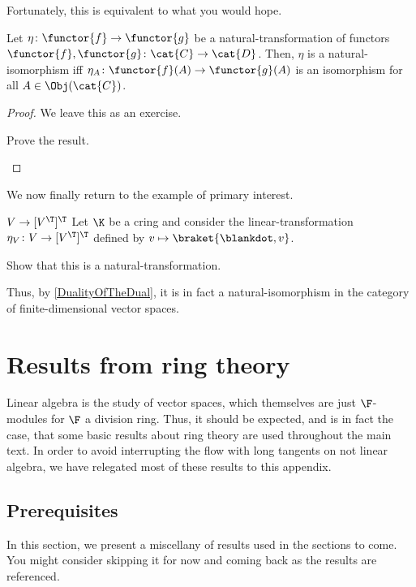 Fortunately, this is equivalent to what you would hope.
\begin{prp}{}{}
	Let $\eta \colon \functor{f}\rightarrow \functor{g}$ be a natural-transformation of functors $\functor{f},\functor{g}\colon \cat{C}\rightarrow \cat{D}$.  Then, $\eta$ is a natural-isomorphism iff $\eta _A\colon \functor{f}(A)\rightarrow \functor{g}(A)$ is an isomorphism for all $A\in \Obj (\cat{C})$.
	\begin{proof}
		We leave this as an exercise.
		\begin{exr}[breakable=false]{}{}
			Prove the result.
		\end{exr}
	\end{proof}
\end{prp}

We now finally return to the example of primary interest.
\begin{exm}{$V\rightarrow [V^{\T}]^{\T}$}{}
	Let $\K$ be a cring and consider the linear-transformation $\eta _V\colon V\rightarrow [V^{\T}]^{\T}$ defined by $v\mapsto \braket{\blankdot ,v}$.
	\begin{exr}[breakable=false]{}{}
		Show that this is a natural-transformation.
	\end{exr}
	Thus, by \cref{DualityOfTheDual}, it is in fact a natural-isomorphism in the category of finite-dimensional vector spaces.
\end{exm}

\cleardoublepage
\chapter{Results from ring theory}

Linear algebra is the study of vector spaces, which themselves are just $\F$-modules for $\F$ a division ring.  Thus, it should be expected, and is in fact the case, that some basic results about ring theory are used throughout the main text.  In order to avoid interrupting the flow with long tangents on not linear algebra, we have relegated most of these results to this appendix.

\section{Prerequisites}

In this section, we present a miscellany of results used in the sections to come.  You might consider skipping it for now and coming back as the results are referenced.

